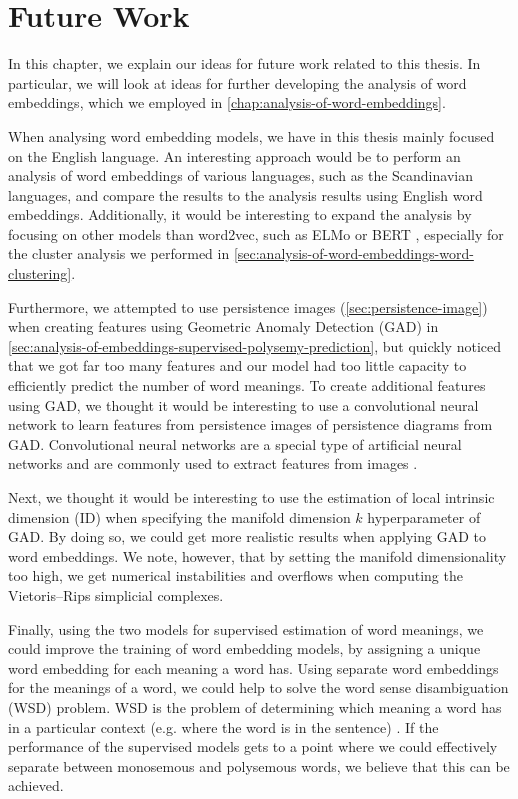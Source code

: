 \chapter{Future Work}
\label{chap:future-work}
In this chapter, we explain our ideas for future work related to this thesis. In particular, we will look at ideas for further developing the analysis of word embeddings, which we employed in \cref{chap:analysis-of-word-embeddings}.

When analysing word embedding models, we have in this thesis mainly focused on the English language. An interesting approach would be to perform an analysis of word embeddings of various languages, such as the Scandinavian languages, and compare the results to the analysis results using English word embeddings. Additionally, it would be interesting to expand the analysis by focusing on other models than word2vec, such as ELMo \cite{elmo2018} or BERT \cite{bert2019}, especially for the cluster analysis we performed in \cref{sec:analysis-of-word-embeddings-word-clustering}.

Furthermore, we attempted to use persistence images (\cref{sec:persistence-image}) when creating features using Geometric Anomaly Detection (GAD) in \cref{sec:analysis-of-embeddings-supervised-polysemy-prediction}, but quickly noticed that we got far too many features and our model had too little capacity to efficiently predict the number of word meanings. To create additional features using GAD, we thought it would be interesting to use a convolutional neural network to learn features from persistence images of persistence diagrams from GAD. Convolutional neural networks are a special type of artificial neural networks and are commonly used to extract features from images \cite[Chapter 8]{Aggarwal18}.

Next, we thought it would be interesting to use the estimation of local intrinsic dimension (ID) when specifying the manifold dimension $k$ hyperparameter of GAD. By doing so, we could get more realistic results when applying GAD to word embeddings. We note, however, that by setting the manifold dimensionality too high, we get numerical instabilities and overflows when computing the Vietoris–Rips simplicial complexes.

Finally, using the two models for supervised estimation of word meanings, we could improve the training of word embedding models, by assigning a unique word embedding for each meaning a word has. Using separate word embeddings for the meanings of a word, we could help to solve the word sense disambiguation (WSD) problem. WSD is the problem of determining which meaning a word has in a particular context (e.g. where the word is in the sentence) \cite[p. 1-2]{AgirreEdmonds2006}. If the performance of the supervised models gets to a point where we could effectively separate between monosemous and polysemous words, we believe that this can be achieved.